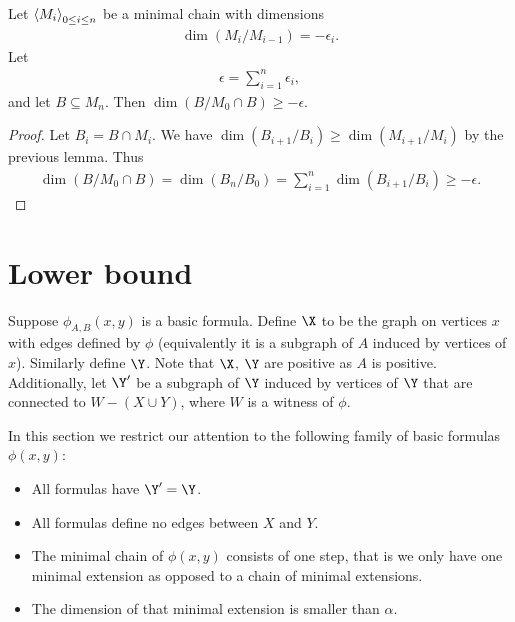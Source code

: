 \documentclass{amsart}
\begin{document}
\begin{Lemma} \label{chain_intersect}
  Let  $\left\langle M_i \right\rangle_{0 \leq i \leq n}$ be  a minimal chain with dimensions
  \begin{align*}
    \dim(M_i/M_{i-1}) = -\epsilon_i.
  \end{align*}
  Let
  \begin{align*}
    \epsilon = \sum_{i = 1}^{n}\epsilon_i,  
  \end{align*}
  and let $B \subseteq M_n$.
  Then $\dim (B / M_0 \cap B) \geq -\epsilon$.
\end{Lemma}

\begin{proof}
  Let $B_i = B \cap M_i$.
  We have $\dim (B_{i+1}/B_i) \geq \dim (M_{i+1}/M_i)$ by the previous lemma.
  Thus
  \begin{align*}
    \dim (B / M_0 \cap B) = \dim (B_n / B_0) = \sum_{i = 1}^n \dim (B_{i+1}/B_i) \geq -\epsilon.
  \end{align*}
\end{proof}

\section{Lower bound}
\begin{Definition} \label{def_basic}
  Suppose $\phi_{A,B}(x, y)$ is a basic formula.
  Define $\X$ to be the graph on vertices $x$ with edges defined by $\phi$
  (equivalently it is a subgraph of $A$ induced by vertices of $x$).
  Similarly define $\Y$.
  Note that $\X$, $\Y$ are positive as $A$ is positive.
  Additionally, let $\Y'$ be a subgraph of $\Y$ induced by vertices of $\Y$ that are connected to $W - (X \cup Y)$,
  where $W$ is a witness of $\phi$.%
\end{Definition}

In this section we restrict our attention to the following family of basic formulas $\phi(x,y)$:
\begin{itemize}
\item All formulas have $\Y' = \Y$.%
\item All formulas define no edges between $X$ and $Y$.
\item The minimal chain of $\phi(x,y)$ consists of one step, that is we only have one minimal extension as opposed to a chain of minimal extensions.
\item The dimension of that minimal extension is smaller than $\alpha$.
\end{itemize}
\end{document}
